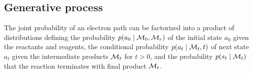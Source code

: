 \subsection{Generative process}

The joint probability of an electron path can be factorized into a product of distributions
defining the probability $p(a_0 \mid {\mathcal{M}}_0, {\mathcal{M}}_r)$ of the initial state $a_0$ given the reactants and reagents, 
the conditional probability $p(a_t \mid {\mathcal{M}}_t, t)$  of next state $a_t$ given the intermediate products ${\mathcal{M}}_t$ for $t > 0$,
and the probability $p(s_t \mid {\mathcal{M}}_t)$ that the reaction terminates with final product ${\mathcal{M}}_t$.

%



